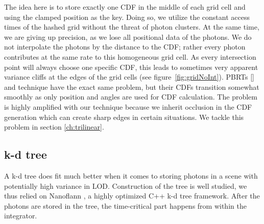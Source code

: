 The idea here is to store exactly one CDF in the middle of each grid cell and using the clamped position as the key. Doing so, we utilize the constant access times of the hashed grid without the threat of photon clusters. At the same time, we are giving up precision, as we lose all positional data of the photons. We do not interpolate the photons by the distance to the CDF; rather every photon contributes at the same rate to this homogeneous grid cell. As every intersection point will always choose one specific CDF, this leads to sometimes very apparent variance cliffs at the edges of the grid cells (see figure~\ref{fig:gridNoInt}). PBRTs [\citeyear{pbrt}] and \textcite{Vevoda} technique have the exact same problem, but their CDFs transition somewhat smoothly as only position and angles are used for CDF calculation. The problem is highly amplified with our technique because we inherit occlusion in the CDF generation which can create sharp edges in certain situations. We tackle this problem in section \ref{ch:trilinear}.


\subsection{k-d tree}
\label{sec:pneekdtree}

A k-d tree does fit much better when it comes to storing photons in a scene with potentially high variance in LOD. Construction of the tree is well studied, we thus relied on Nanoflann \parencite{blanco2014nanoflann}, a highly optimized C++ k-d tree framework. After the photons are stored in the tree, the time-critical part happens from within the integrator. 

